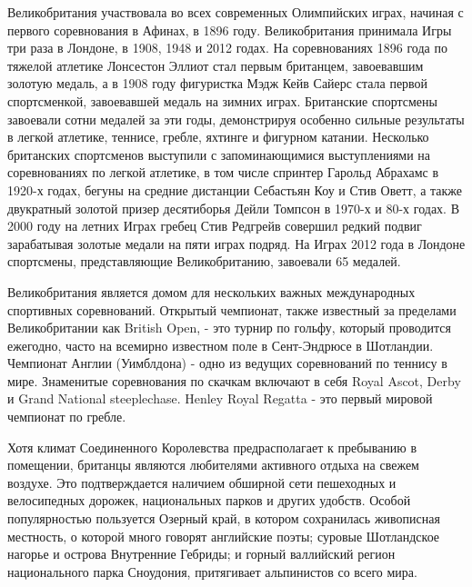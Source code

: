 Великобритания участвовала во всех современных Олимпийских играх, начиная с первого соревнования в Афинах, в 1896 году. Великобритания принимала Игры три раза в Лондоне, в 1908, 1948 и 2012 годах. На соревнованиях 1896 года по тяжелой атлетике Лонсестон Эллиот стал первым британцем, завоевавшим золотую медаль, а в 1908 году фигуристка Мэдж Кейв Сайерс стала первой спортсменкой, завоевавшей медаль на зимних играх. Британские спортсмены завоевали сотни медалей за эти годы, демонстрируя особенно сильные результаты в легкой атлетике, теннисе, гребле, яхтинге и фигурном катании. Несколько британских спортсменов выступили с запоминающимися выступлениями на соревнованиях по легкой атлетике, в том числе спринтер Гарольд Абрахамс в 1920-х годах, бегуны на средние дистанции Себастьян Коу и Стив Оветт, а также двукратный золотой призер десятиборья Дейли Томпсон в 1970-х и 80-х годах. В 2000 году на летних Играх гребец Стив Редгрейв совершил редкий подвиг зарабатывая золотые медали на пяти играх подряд. На Играх 2012 года в Лондоне спортсмены, представляющие Великобританию, завоевали 65 медалей.

Великобритания является домом для нескольких важных международных спортивных соревнований. Открытый чемпионат, также известный за пределами Великобритании как British Open, - это турнир по гольфу, который проводится ежегодно, часто на всемирно известном поле в Сент-Эндрюсе в Шотландии. Чемпионат Англии (Уимблдона) - одно из ведущих соревнований по теннису в мире. Знаменитые соревнования по скачкам включают в себя Royal Ascot, Derby и Grand National steeplechase. Henley Royal Regatta - это первый мировой чемпионат по гребле.

Хотя климат Соединенного Королевства предрасполагает к пребыванию в помещении, британцы являются любителями активного отдыха на свежем воздухе. Это подтверждается наличием обширной сети пешеходных и велосипедных дорожек, национальных парков и других удобств. Особой популярностью пользуется Озерный край, в котором сохранилась живописная местность, о которой много говорят английские поэты; суровые Шотландское нагорье и острова Внутренние Гебриды; и горный валлийский регион национального парка Сноудония, притягивает альпинистов со всего мира.